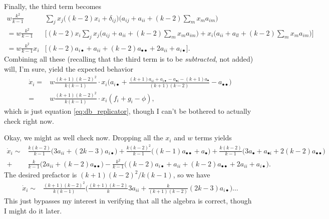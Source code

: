 \documentclass[14pt, a4paper, justified]{article}
\begin{document}
Finally, the third term becomes
\begin{equation}
    \begin{split}
        w \frac{k^2}{k-1} & \sum_j x_j \Big( (k-2)x_i + \delta_{ij} \Big) \Big( a_{ij} + a_{ii} + (k-2) \sum_m x_m a_{im} \Big)
        \\
        = w \frac{k^2}{k-1} & \Big[ (k-2) x_i \sum_j x_j \Big( a_{ij} + a_{ii} + (k-2) \sum_m x_m a_{im} \Big) + x_i \Big( a_{ii} + a_{ll} + (k-2) \sum_m x_m a_{im} \Big) \Big]
        \\
        = w \frac{k^2}{k-1} x_i & \Big[ (k-2) a_{i \bullet} + a_{ii} + (k-2) a_{\bullet \bullet} + 2a_{ii} + a_{i \bullet} \Big].
    \end{split}
\end{equation}
Combining all these (recalling that the third term is to be \emph{subtracted}, not added) will, I'm sure, yield the expected behavior
\begin{equation}
    \begin{split}
        \dot{x}_i = & w \frac{(k+1)(k-2)^2}{k(k-1)} \cdot x_i \Big( a_{i \bullet} + \frac{(k+1)a_{ii} + a_{i \bullet} - a_{\bullet i} - (k+1) a_{\bullet}}{(k+1)(k-2)} - a_{\bullet \bullet} \Big)
        \\
        = & w \frac{(k+1)(k-2)^2}{k(k-1)} \cdot x_i (f_i + g_i - \phi),
    \end{split}
\end{equation}
which is just equation \ref{eq:db_replicator}, though I can't be bothered to actually check right now.

Okay, we might as well check now.
Dropping all the $x_i$ and $w$ terms yields
\begin{equation}
    \begin{split}
        \dot{x}_i \sim & \frac{k(k-2)}{k-1} \Big( 3a_{ii} + (2k - 3) a_{i \bullet} \Big) + \frac{k(k-2)^2}{k-1} \Big( (k-1) a_{\bullet \bullet} + a_{\bullet} \Big) + \frac{k(k-2)}{k-1}\Big( 3a_{\bullet} + a_{\bullet i} + 2(k-2)a_{\bullet \bullet} \Big)
        \\
        + & \frac{k}{k-1} \Big( 2a_{ii} + (k-2) a_{\bullet \bullet} \Big) - \frac{k^2}{k-1} \Big( (k-2) a_{i \bullet} + a_{ii} + (k-2) a_{\bullet \bullet} + 2a_{ii} + a_{i \bullet} \Big).
    \end{split}
\end{equation}
The desired prefactor is $(k+1)(k-2)^2/k(k-1)$, so we have
\begin{equation}
    \begin{split}
        \dot{x}_i \sim & \frac{(k+1)(k-2)^2}{k(k-1)} \Big( \frac{(k+1)(k-2)}{k} 3a_{ii} + \frac{k}{(k+1)(k-2)} (2k-3) a_{i \bullet} \Big) \ldots
    \end{split}
\end{equation}
This just bypasses my interest in verifying that all the algebra is correct, though I might do it later.
\end{document}

